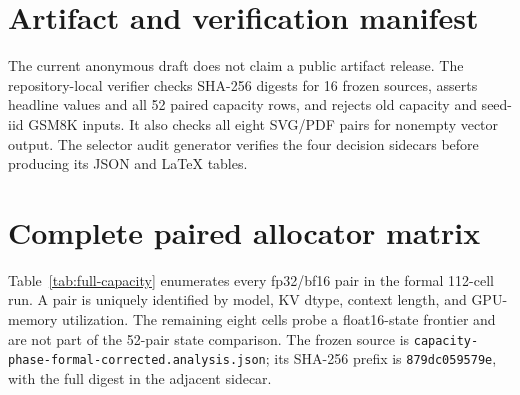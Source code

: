 \documentclass{article}
\begin{document}
\section{Artifact and verification manifest}
\label{app:artifact}

The current anonymous draft does not claim a public artifact release. The
repository-local verifier checks SHA-256 digests for 16 frozen sources,
asserts headline values and all 52 paired capacity rows, and rejects old
capacity and seed-iid GSM8K inputs. It also checks all eight SVG/PDF pairs for
nonempty vector output. The selector audit generator verifies the four
decision sidecars before producing its JSON and LaTeX tables.

\clearpage
\onecolumn
\section{Complete paired allocator matrix}
\label{app:full-matrix}

Table~\ref{tab:full-capacity} enumerates every fp32/bf16 pair in the formal
112-cell run. A pair is uniquely identified by model, KV dtype, context length,
and GPU-memory utilization. The remaining eight cells probe a float16-state
frontier and are not part of the 52-pair state comparison. The frozen source is
\texttt{capacity-phase-formal-corrected.analysis.json}; its SHA-256 prefix is
\texttt{879dc059579e}, with the full digest in the adjacent sidecar.


\end{document}
